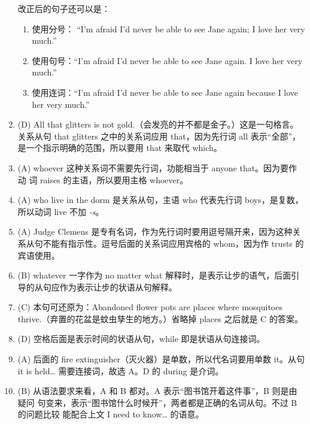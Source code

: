 \begin{enumerate}
{    改正后的句子还可以是：
    \begin{enumerate}

    \item 使用分号： “I'm afraid I'd never be able to see Jane again; I love
      her very much.”
    \item 使用句号：“I'm afraid I'd never be able to see Jane again. I love
      her very much.”
    \item 使用连词：“I'm afraid I'd never be able to see Jane again because I
      love her very much.”
    \end{enumerate}
  }

\item (D) All that glitters is not gold.（会发亮的并不都是金子。）这是一句格言。
  关系从句 that glitters 之中的关系词应用 that，因为先行词 all 表示“全部”，
  是一个指示明确的范围，所以要用 that 来取代 which。

\item (A) whoever 这种关系词不需要先行词，功能相当于 anyone that。因为要作动
  词 raises 的主语，所以要用主格 whoever。

\item  (A) who live in the dorm 是关系从句，主语 who 代表先行词 boys，是复数， 所以动词 live 不加 \emph{-s}。
\item (A) Judge Clemens 是专有名词，作为先行词时要用逗号隔开来，因为这种关系从句不能有指示性。逗号后面的关系词应用宾格的 whom，因为作 trusts 的宾语使用。

\item (B) whatever 一字作为 no matter what 解释时，是表示让步的语气，后面引导的从句应作为表示让步的状语从句解释。

\item (C) 本句可还原为：Abandoned flower pots are places where mosquitoes thrive.（弃置的花盆是蚊虫孳生的地方。）省略掉 places 之后就是 C 的答案。


\item (D) 空格后面是表示时间的状语从句，while 即是状语从句连接词。

\item  (A) 后面的 fire extinguisher（灭火器）是单数，所以代名词要用单数 it。从句 it is held… 需要连接词，故选 A。D 的 during 是介词。
\item (B) 从语法要求来看，A 和 B 都对。A 表示“图书馆开着这件事”，B 则是由疑问
  句变来，表示“图书馆什么时候开”，两者都是正确的名词从句。不过 B 的问题比较
  能配合上文 I need to know… 的语意。
\end{enumerate}

